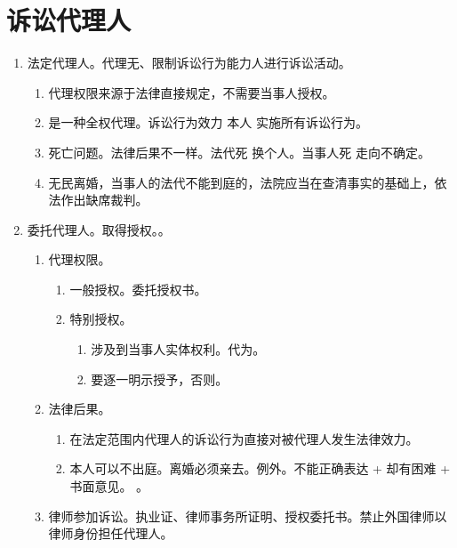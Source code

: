 \section{诉讼代理人}
\begin{enumerate}
  \item 法定代理人。代理无、限制诉讼行为能力人进行诉讼活动。
        \begin{enumerate}
          \item 代理权限来源于法律直接规定，不需要当事人授权。
          \item 是一种全权代理。诉讼行为效力 \ydy 本人 \yjt 实施所有诉讼行为。
          \item 死亡问题。法律后果不一样。法代死 \yjt 换个人。当事人死 \yjt 走向不确定。
          \item 无民离婚，当事人的法代不能到庭的，法院应当在查清事实的基础上，依法作出缺席裁判。
        \end{enumerate}
  \item 委托代理人。取得授权。。
        \begin{enumerate}
          \item 代理权限。
                \begin{enumerate}
                  \item 一般授权。委托授权书。
                  \item 特别授权。
                        \begin{enumerate}
                          \item 涉及到当事人实体权利。代为。
                          \item 要逐一明示授予，否则。
                        \end{enumerate}
                \end{enumerate}
          \item 法律后果。
                \begin{enumerate}
                  \item 在法定范围内代理人的诉讼行为直接对被代理人发生法律效力。
                  \item 本人可以不出庭。离婚必须亲去。例外。不能正确表达 + 却有困难 + 书面意见。
                        。
                \end{enumerate}
          \item 律师参加诉讼。执业证、律师事务所证明、授权委托书。禁止外国律师以律师身份担任代理人。
        \end{enumerate}
\end{enumerate}
